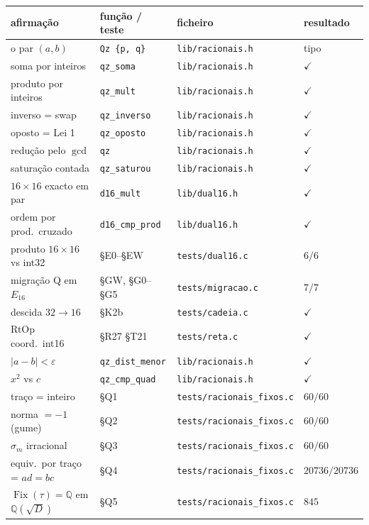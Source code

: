 \documentclass[11pt,a4paper]{article}
\newcommand{\code}[1]{\texttt{\small #1}}
\begin{document}
\begin{center}\small
\begin{tabular}{@{}llll@{}}
\toprule
afirmação & função / teste & ficheiro & resultado \\
\midrule
o par $(a,b)$ & \code{Qz \{p, q\}} & \code{lib/racionais.h} & tipo \\
soma por inteiros & \code{qz\_soma} & \code{lib/racionais.h} & $\checkmark$ \\
produto por inteiros & \code{qz\_mult} & \code{lib/racionais.h} & $\checkmark$ \\
inverso = swap & \code{qz\_inverso} & \code{lib/racionais.h} & $\checkmark$ \\
oposto = Lei 1 & \code{qz\_oposto} & \code{lib/racionais.h} & $\checkmark$ \\
redução pelo $\gcd$ & \code{qz} & \code{lib/racionais.h} & $\checkmark$ \\
saturação contada & \code{qz\_saturou} & \code{lib/racionais.h} & $\checkmark$ \\
$16\times16$ exacto em par & \code{d16\_mult} & \code{lib/dual16.h} & $\checkmark$ \\
ordem por prod.\ cruzado & \code{d16\_cmp\_prod} & \code{lib/dual16.h} & $\checkmark$ \\
produto $16\times16$ vs int32 & §E0--§EW & \code{tests/dual16.c} & $6/6$ \\
migração Q em $E_{16}$ & §GW, §G0--§G5 & \code{tests/migracao.c} & $7/7$ \\
descida $32\to16$ & §K2b & \code{tests/cadeia.c} & $\checkmark$ \\
RtOp coord.\ int16 & §R27 §T21 & \code{tests/reta.c} & $\checkmark$ \\
$|a-b|<\varepsilon$ & \code{qz\_dist\_menor} & \code{lib/racionais.h} & $\checkmark$ \\
$x^2$ vs $c$ & \code{qz\_cmp\_quad} & \code{lib/racionais.h} & $\checkmark$ \\
traço = inteiro & §Q1 & \code{tests/racionais\_fixos.c} & $60/60$ \\
norma $=-1$ (gume) & §Q2 & \code{tests/racionais\_fixos.c} & $60/60$ \\
$\sigma_m$ irracional & §Q3 & \code{tests/racionais\_fixos.c} & $60/60$ \\
equiv.\ por traço = $ad{=}bc$ & §Q4 & \code{tests/racionais\_fixos.c} & $20736/20736$ \\
$\operatorname{Fix}(\tau)=\mathbb{Q}$ em $\mathbb{Q}(\sqrt D)$ & §Q5 & \code{tests/racionais\_fixos.c} & $845$ \\

\end{tabular}
\end{center}
\end{document}
